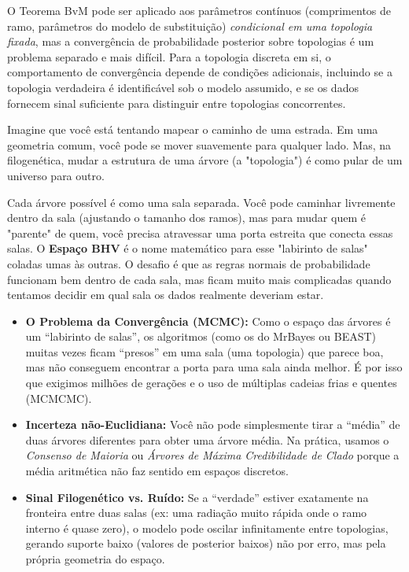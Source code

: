 O Teorema BvM pode ser aplicado aos parâmetros contínuos (comprimentos de ramo, parâmetros do modelo de substituição) \textit{condicional em uma topologia fixada}, mas a convergência de probabilidade posterior sobre topologias é um problema separado e mais difícil. Para a topologia discreta em si, o comportamento de convergência depende de condições adicionais, incluindo se a topologia verdadeira é identificável sob o modelo assumido, e se os dados fornecem sinal suficiente para distinguir entre topologias concorrentes.

\begin{tcolorbox}[
    colback=green!5!white, 
    colframe=green!50!black, 
    title=\textbf{Explicando de forma simples: O Problema das Árvores},
    arc=2mm, %
    boxrule=0.5pt
]
Imagine que você está tentando mapear o caminho de uma estrada. Em uma geometria comum, você pode se mover suavemente para qualquer lado. Mas, na filogenética, mudar a estrutura de uma árvore (a "topologia") é como pular de um universo para outro. 

Cada árvore possível é como uma sala separada. Você pode caminhar livremente dentro da sala (ajustando o tamanho dos ramos), mas para mudar quem é "parente" de quem, você precisa atravessar uma porta estreita que conecta essas salas. O \textbf{Espaço BHV} é o nome matemático para esse "labirinto de salas" coladas umas às outras. O desafio é que as regras normais de probabilidade funcionam bem dentro de cada sala, mas ficam muito mais complicadas quando tentamos decidir em qual sala os dados realmente deveriam estar.
\end{tcolorbox}

\begin{tcolorbox}[
    colback=red!5!white, 
    colframe=red!75!black, 
    title=\textbf{Consequências Práticas para a Pesquisa},
    arc=2mm
]
\begin{itemize}
    \item \textbf{O Problema da Convergência (MCMC):} Como o espaço das árvores é um ``labirinto de salas'', os algoritmos (como os do MrBayes ou BEAST) muitas vezes ficam ``presos'' em uma sala (uma topologia) que parece boa, mas não conseguem encontrar a porta para uma sala ainda melhor. É por isso que exigimos milhões de gerações e o uso de múltiplas cadeias frias e quentes (MCMCMC).
    \item \textbf{Incerteza não-Euclidiana:} Você não pode simplesmente tirar a ``média'' de duas árvores diferentes para obter uma árvore média. Na prática, usamos o \textit{Consenso de Maioria} ou \textit{Árvores de Máxima Credibilidade de Clado} porque a média aritmética não faz sentido em espaços discretos.
    \item \textbf{Sinal Filogenético vs. Ruído:} Se a ``verdade'' estiver exatamente na fronteira entre duas salas (ex: uma radiação muito rápida onde o ramo interno é quase zero), o modelo pode oscilar infinitamente entre topologias, gerando suporte baixo (valores de posterior baixos) não por erro, mas pela própria geometria do espaço.
\end{itemize}
\end{tcolorbox}

